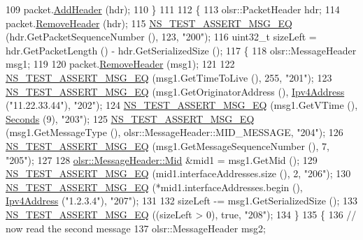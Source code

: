 \begin{DoxyCode}
109     packet.\hyperlink{classns3_1_1Packet_a465108c595a0bc592095cbcab1832ed8}{AddHeader} (hdr);
110   \}
111 
112   \{
113     olsr::PacketHeader hdr;
114     packet.\hyperlink{classns3_1_1Packet_a0961eccf975d75f902d40956c93ba63e}{RemoveHeader} (hdr);
115     \hyperlink{group__testing_ga2a9d78cffb3db8e867c35fff0b698cf5}{NS\_TEST\_ASSERT\_MSG\_EQ} (hdr.GetPacketSequenceNumber (), 123, \textcolor{stringliteral}{"200"});
116     uint32\_t sizeLeft = hdr.GetPacketLength () - hdr.GetSerializedSize ();
117     \{
118       olsr::MessageHeader msg1;
119 
120       packet.\hyperlink{classns3_1_1Packet_a0961eccf975d75f902d40956c93ba63e}{RemoveHeader} (msg1);
121 
122       \hyperlink{group__testing_ga2a9d78cffb3db8e867c35fff0b698cf5}{NS\_TEST\_ASSERT\_MSG\_EQ} (msg1.GetTimeToLive (),  255, \textcolor{stringliteral}{"201"});
123       \hyperlink{group__testing_ga2a9d78cffb3db8e867c35fff0b698cf5}{NS\_TEST\_ASSERT\_MSG\_EQ} (msg1.GetOriginatorAddress (), 
      \hyperlink{classns3_1_1Ipv4Address}{Ipv4Address} (\textcolor{stringliteral}{"11.22.33.44"}), \textcolor{stringliteral}{"202"});
124       \hyperlink{group__testing_ga2a9d78cffb3db8e867c35fff0b698cf5}{NS\_TEST\_ASSERT\_MSG\_EQ} (msg1.GetVTime (), \hyperlink{group__timecivil_ga33c34b816f8ff6628e33d5c8e9713b9e}{Seconds} (9), \textcolor{stringliteral}{"203"});
125       \hyperlink{group__testing_ga2a9d78cffb3db8e867c35fff0b698cf5}{NS\_TEST\_ASSERT\_MSG\_EQ} (msg1.GetMessageType (), olsr::MessageHeader::MID\_MESSAGE,
       \textcolor{stringliteral}{"204"});
126       \hyperlink{group__testing_ga2a9d78cffb3db8e867c35fff0b698cf5}{NS\_TEST\_ASSERT\_MSG\_EQ} (msg1.GetMessageSequenceNumber (), 7, \textcolor{stringliteral}{"205"});
127 
128       \hyperlink{structns3_1_1olsr_1_1MessageHeader_1_1Mid}{olsr::MessageHeader::Mid} &mid1 = msg1.GetMid ();
129       \hyperlink{group__testing_ga2a9d78cffb3db8e867c35fff0b698cf5}{NS\_TEST\_ASSERT\_MSG\_EQ} (mid1.interfaceAddresses.size (), 2, \textcolor{stringliteral}{"206"});
130       \hyperlink{group__testing_ga2a9d78cffb3db8e867c35fff0b698cf5}{NS\_TEST\_ASSERT\_MSG\_EQ} (*mid1.interfaceAddresses.begin (), 
      \hyperlink{classns3_1_1Ipv4Address}{Ipv4Address} (\textcolor{stringliteral}{"1.2.3.4"}), \textcolor{stringliteral}{"207"});
131 
132       sizeLeft -= msg1.GetSerializedSize ();
133       \hyperlink{group__testing_ga2a9d78cffb3db8e867c35fff0b698cf5}{NS\_TEST\_ASSERT\_MSG\_EQ} ((sizeLeft > 0), \textcolor{keyword}{true}, \textcolor{stringliteral}{"208"});
134     \}
135     \{
136       \textcolor{comment}{// now read the second message}
137       olsr::MessageHeader msg2;

\end{DoxyCode}

